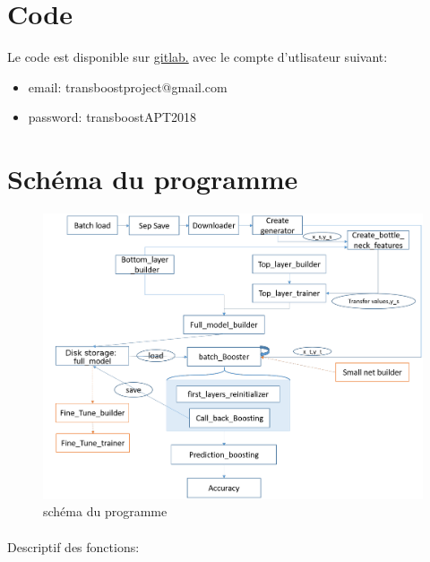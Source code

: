 \documentclass[11 pt]{article}
\begin{document}
\bigskip
\nocite{*}



\pagebreak
\begin{appendices}
  \section{Code}
    Le code est disponible sur \href{https://gitlab.com/zlanderous/transboost}{gitlab.} avec le compte d'utlisateur suivant:
    \begin{itemize}
    	\item email: transboostproject@gmail.com
        \item password: transboostAPT2018
    \end{itemize}

  \section{Schéma du programme}
  \begin{figure}[h]
    \includegraphics[width=\textwidth]{schema.png}
    \caption{schéma du programme}
    \label{figTot}
  \end{figure}
  \paragraph{}Descriptif des fonctions:\\


\end{appendices}
\end{document}
